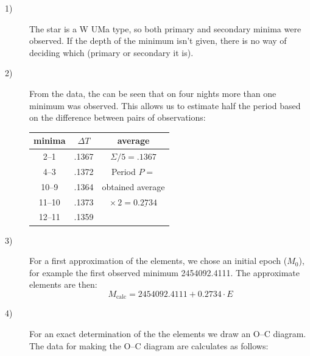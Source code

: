 \begin{description}
\item[1)] The star is a W UMa type, so both primary and secondary minima were
  observed. If the depth of the minimum isn't given, there is no way of
  deciding which (primary or secondary it is).

\item[2)] From the data, the can be seen that on four nights more than one
  minimum was observed. This allows us to estimate half the period based on
  the difference between pairs of observations:

  \begin{center}
  \begin{tabular}{ccc}
    \hline
    minima & $\Delta T$ & average \\
    \hline
    2--1   & .1367 & $\Sigma/5 = .1367$ \\
    4--3   & .1372 & Period $P =$ \\
    10--9  & .1364 & obtained average \\
    11--10 & .1373 & $\times\,2 = \underline{0.2734}$ \\
    12--11 & .1359 & \\
    \hline
  \end{tabular}
  \end{center}

\item[3)] For a first approximation of the elements, we chose an initial epoch
  ($M_0$), for example the first observed minimum 2454092.4111. The
  approximate elements are then:
  \[ M_{\mathrm{calc}} = 2454092.4111 + 0.2734 \cdot E \]

\item[4)] For an exact determination of the the elements we draw an O--C
  diagram. The data for making the O--C diagram are calculates as follows:


\end{description}
